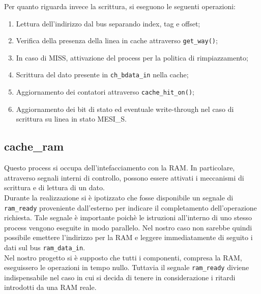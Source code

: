 Per quanto riguarda invece la scrittura, si eseguono le seguenti operazioni:
\begin{enumerate}
  \item Lettura dell'indirizzo dal bus separando index, tag e offset; 
  \item Verifica della presenza della linea in cache attraverso \texttt{get\_way()};
  \item In caso di MISS, attivazione del process per la politica di rimpiazzamento;
  \item Scrittura del dato presente in \texttt{ch\_bdata\_in} nella cache;
  \item Aggiornamento dei contatori attraverso \texttt{cache\_hit\_on()};
  \item Aggiornamento dei bit di stato ed eventuale write-through nel caso di scrittura su linea in stato MESI\_S.
\end{enumerate}





\subsection{cache\_ram}

Questo process si occupa dell'intefacciamento con la RAM. In particolare, attraverso segnali interni di controllo, possono essere attivati i meccanismi di scrittura e di lettura di un dato.\\

Durante la realizzazione si \`e ipotizzato che fosse disponibile un segnale di \texttt{ram\_ready} proveniente dall'esterno per indicare il completamento dell'operazione richiesta. Tale segnale \`e importante poich\`e le istruzioni all'interno di uno stesso process vengono eseguite in modo parallelo. Nel nostro caso non sarebbe quindi possibile emettere l'indirizzo per la RAM e leggere immediatamente di seguito i dati sul bus \texttt{ram\_data\_in}.\\

Nel nostro progetto si \`e supposto che tutti i componenti, compresa la RAM, eseguissero le operazioni in tempo nullo. Tuttavia il segnale \texttt{ram\_ready} diviene indispensabile nel caso in cui si decida di tenere in considerazione i ritardi introdotti da una RAM reale.


